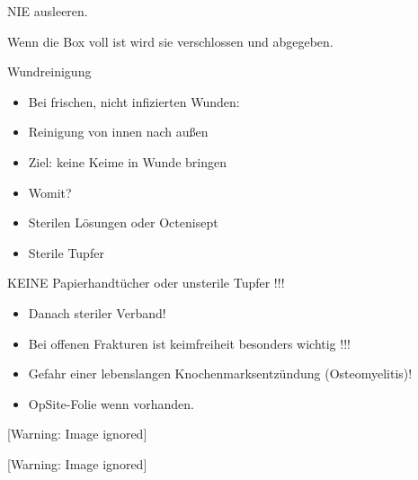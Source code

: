 \documentclass{article}
\makeatletter
\newcommand\captionof[1]{\def\@captype{#1}\caption}
\makeatother
\begin{document}
NIE ausleeren.

Wenn die Box voll ist wird sie verschlossen und abgegeben.

Wundreinigung

\begin{itemize}
\item Bei frischen, nicht infizierten Wunden:

\end{itemize}
\begin{itemize}
\item Reinigung von innen nach au{\ss}en

\item Ziel: keine Keime in Wunde bringen

\end{itemize}
\begin{itemize}
\item Womit?

\end{itemize}
\begin{itemize}
\item Sterilen L\"osungen oder Octenisept

\item Sterile Tupfer

\end{itemize}
KEINE Papierhandt\"ucher oder unsterile Tupfer !!!

\begin{itemize}
\item Danach steriler Verband!

\end{itemize}
\begin{itemize}
\item Bei offenen Frakturen ist keimfreiheit be\-sonders wichtig !!!

\item Gefahr einer lebenslangen Knochen\-marks\-ent\-z\"undung
(Osteomyelitis)!

\item {}OpSite{}-Folie wenn vorhanden.

\end{itemize}
 [Warning: Image ignored] %
\captionof{figure}[Reiningung einer sauberen Wunde: Von Innen nach
Aussen, der Tupfer wird anschliessend verworfen.]{Reiningung einer
sauberen Wunde: Von Innen nach Aussen, der Tupfer wird anschliessend
verworfen.}
 [Warning: Image ignored] %
\captionof{figure}[Anbringen einer OpSite(TM)-Folie: Es ist wichtig die
Folie zu spannen damit sie sich nicht selbst verklebt. ]{Anbringen
einer OpSite(TM)-Folie: Es ist wichtig die Folie zu spannen damit sie
sich nicht selbst verklebt. }
\end{document}
